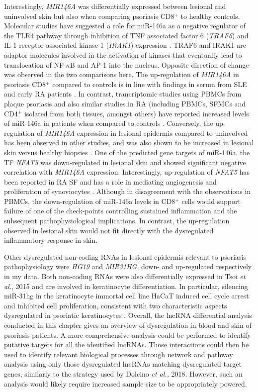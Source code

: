 Interestingly, \textit{MIR146A} was differentially expressed between lesional and uninvolved skin but also when comparing psoriasis CD8$^+$ to healthy controls. Molecular studies have suggested a role for miR-146a as a negative regulator of the TLR4 pathway through inhibition of TNF associated factor 6 (\textit{TRAF6}) and IL-1 receptor-associated kinase 1 (\textit{IRAK1}) expression \parencite{Taganov2006}. TRAF6 and IRAK1 are adaptor molecules involved in the activation of kinases that eventually lead to translocation of NF-$\kappa$B and AP-1 into the nucleus. Opposite direction of change was observed in the two comparisons here. The up-regulation of \textit{MIR146A} in psoriasis CD8$^+$ compared to controls is in line with findings in serum from SLE and early RA patients \parencite{Wang2012,Filkova}. In contrast, trancriptomic studies using PBMCs from plaque psoriasis and also similar studies in RA (including PBMCs, SFMCs and CD4$^+$ isolated from both tissues, amongst others) have reported increased levels of miR-146a in patients when compared to controls \parencite{Ele-Refaei2015,Churov2015}. Conversely, the up-regulation of \textit{MIR146A} expression in lesional epidermis compared to uninvolved has been observed in other studies, and was also shown to be increased in lesional skin versus healthy biopsies \parencite{Lerman2014, Tsoi2015,Li2014}. One of the predicted gene targets of miR-146a, the TF \textit{NFAT5} was down-regulated in lesional skin and showed significant negative correlation with \textit{MIR146A} expression. Interestingly, up-regulation of \textit{NFAT5} has been reported in RA SF and has a role in mediating angiogenesis and proliferation of synoviocytes \parencite{Han2017}. Although in disagreement with the observations in PBMCs, the down-regulation of miR-146a levels in CD8$^+$ cells would support failure of one of the check-points controlling sustained inflammation and the subsequent pathophysiological implications. In contrast, the up-regulation observed in lesional skin would not fit directly with the dysregulated inflammatory response in skin. 


Other dysregulated non-coding RNAs in lesional epidermis relevant to psoriasis pathophysiology were \textit{HG19} and \textit{MIR31HG}, down- and up-regulated respectively in my data. Both non-coding RNAs were also differentially expressed in Tsoi \textit{et al.}, 2015 and are involved in keratinocyte differentiation. In particular, silencing miR-31hg in the keratinocyte immortal cell line HaCaT induced cell cycle arrest and inhibited cell proliferation, consistent with two characteristic aspects dysregulated in psoriatic keratinocytes \parencite{Gao2018}.
Overall, the lncRNA differential analysis conducted in this chapter gives an overview of dysregulation in blood and skin of psoriasis patients. A more comprehensive analysis could be performed to identify putative targets for all the identified lncRNAs. Those interactions could then be used to identify relevant biological processes through network and pathway analysis using only those dysregulated lncRNAs matching dysregulated target genes, similarly to the strategy used by Dolcino \textit{et al.,} 2018. However, such an analysis would likely require increased sample size to be appropriately powered.

